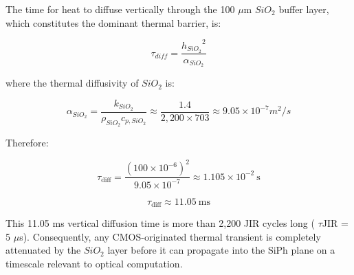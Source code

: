 \documentclass[journal]{IEEEtran}
\begin{document}
The time for heat to diffuse vertically through the 100 $\mu$m $SiO_2$ buffer layer, which constitutes the dominant thermal barrier, is:

\begin{equation}
\tau_{diff} = \frac {{h_{SiO_2}}^{2}}{\alpha_{SiO_2}}
\end{equation}

where the thermal diffusivity of $SiO_2$ is:

\begin{equation}
\alpha_{SiO_2} = \frac{k_{SiO_2}}{\rho_{SiO_2} c_{p,SiO_2}}
\approx \frac{1.4}{2,200 \times 703} \approx 9.05 \times 10^{-7} m^{2}/s
\end{equation}

Therefore:

\begin{equation}
\tau_{\mathrm{diff}}
=
\frac{(100 \times 10^{-6})^{2}}
     {9.05 \times 10^{-7}}
\approx
1.105 \times 10^{-2}~\mathrm{s}
\end{equation}

\begin{equation}
\tau_{\mathrm{diff}} \approx 11.05~\mathrm{ms}
\end{equation}

This 11.05 ms vertical diffusion time is more than 2,200 JIR cycles long ( $\tau$JIR = 5 $\mu$s). Consequently, any CMOS-originated thermal transient is completely attenuated by the $SiO_2$ layer before it can propagate into the SiPh plane on a timescale relevant to optical computation.
\end{document}
